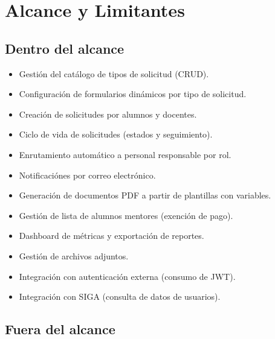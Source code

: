 \section{Alcance y Limitantes}

\subsection*{Dentro del alcance}

\begin{itemize}
    \item Gestión del catálogo de tipos de solicitud (CRUD).
    \item Configuración de formularios dinámicos por tipo de solicitud.
    \item Creación de solicitudes por alumnos y docentes.
    \item Ciclo de vida de solicitudes (estados y seguimiento).
    \item Enrutamiento automático a personal responsable por rol.
    \item Notificaciónes por correo electrónico.
    \item Generación de documentos PDF a partir de plantillas con variables.
    \item Gestión de lista de alumnos mentores (exención de pago).
    \item Dashboard de métricas y exportación de reportes.
    \item Gestión de archivos adjuntos.
    \item Integración con autenticación externa (consumo de JWT).
    \item Integración con SIGA (consulta de datos de usuarios).
\end{itemize}

\subsection*{Fuera del alcance}

